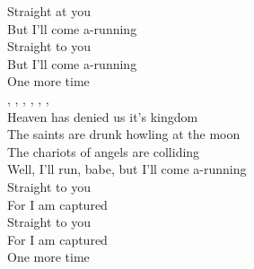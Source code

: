  Straight at you \\
 But I'll come a-running \\
 Straight to you \\
 But I'll come a-running \\
 One more  time \\
, , , , , , \\
 Heaven has denied us it's  kingdom \\
 The saints are drunk howling at the  moon \\
  The chariots of angels are  colliding \\
Well, I'll  run, babe, but I'll come a-running \\
 Straight to you \\
 For I am captured \\
 Straight to you \\
 For I am captured \\
 One more  time \\

